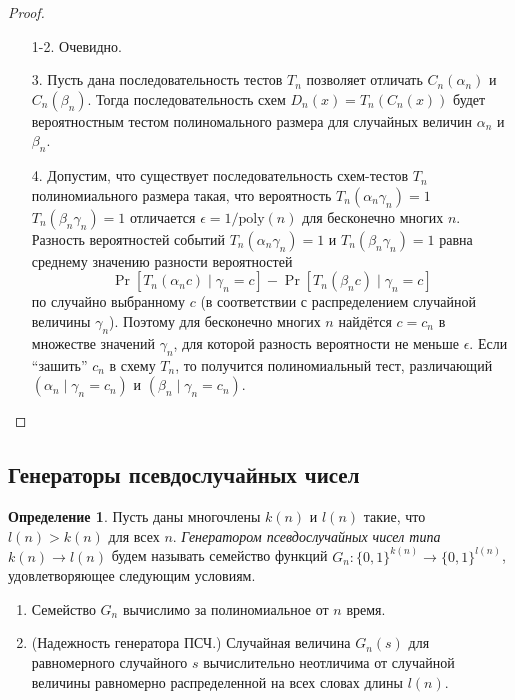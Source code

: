 \documentclass[12pt,a4paper]{article}
\newcommand{\bits}{\{0,1\}}
\newcommand{\poly}{\mathrm{poly}}
\theoremstyle{definition}
\newtheorem{definition}{Определение}[section]
\theoremstyle{plain}
\theoremstyle{remark}
\begin{document}
\begin{proof}\mbox{}
\begin{enumerate}
\item[1-2.] Очевидно.
\item[3.] Пусть дана последовательность тестов $T_n$
позволяет отличать $C_n(\alpha_n)$ и $C_n(\beta_n)$.
Тогда последовательность схем $D_n(x) = T_n(C_n(x))$
будет вероятностным тестом полиномального размера 
для случайных величин $\alpha_n$ и $\beta_n$.

\item[4.]
Допустим, что существует последовательность 
схем-тестов $T_n$ полиномиального размера такая, что
вероятность $T_n(\alpha_n\gamma_n) = 1$
$T_n(\beta_n\gamma_n) = 1$ отличается $\epsilon = 1/\poly(n)$
для бесконечно многих $n$. Разность вероятностей
событий $T_n(\alpha_n\gamma_n) = 1$ и
$T_n(\beta_n\gamma_n) = 1$ равна среднему значению разности
вероятностей
$$
\Pr[T_n(\alpha_n c) \mid \gamma_n = c] - 
\Pr[T_n(\beta _n c) \mid \gamma_n = c]
$$
по случайно выбранному $c$ (в соответствии с распределением
случайной величины $\gamma_n$). Поэтому для бесконечно
многих $n$ найдётся $c=c_n$ в множестве значений $\gamma_n$,
для которой разность вероятности не меньше $\epsilon$.
Если ``зашить'' $c_n$ в схему $T_n$, то получится полиномиальный тест, различающий 
$(\alpha_n\mid\gamma_n = c_n)$ и 
$(\beta_n\mid\gamma_n = c_n)$.
\end{enumerate}
\end{proof}

\subsection{Генераторы псевдослучайных чисел}
\begin{definition}
Пусть даны многочлены $k(n)$ и $l(n)$ такие, что
$l(n) > k(n)$ для всех $n$. \emph{Генератором
псевдослучайных чисел типа $k(n)\to l(n)$} будем
называть семейство функций $G_n : \bits^{k(n)}\to \bits^{l(n)}$, удовлетворяющее следующим условиям.
\begin{enumerate}
\item Семейство $G_n$ вычислимо за полиномиальное от $n$ время.
\item (Надежность генератора ПСЧ.) Случайная величина $G_n(s)$ для равномерного случайного $s$ вычислительно неотличима от случайной величины равномерно распределенной
на всех словах длины $l(n)$.
\end{enumerate}
\end{definition}
\end{document}
